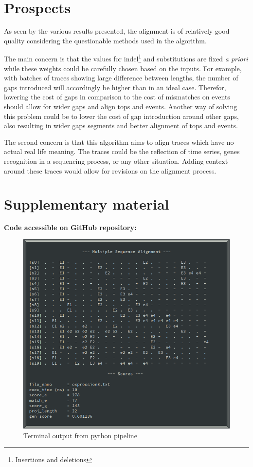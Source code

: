 \documentclass[12pt,a4paper]{article}
\begin{document}
\section{Prospects}

As seen by the various results presented, the alignment is of relatively good quality considering the questionable methods used in the algorithm.

The main concern is that the values for indel\footnote{Insertions and deletions} and substitutions are fixed \emph{a priori} while these weights could be carefully chosen based on the inputs.
For example, with batches of traces showing large difference between lengths, the number of gaps introduced will accordingly be higher than in an ideal case.
Therefor, lowering the cost of gaps in comparison to the cost of mismatches on events should allow for wider gaps and align tops and events.
Another way of solving this problem could be to lower the cost of gap introduction around other gaps, also resulting in wider gaps segments and better alignment of tops and events.

The second concern is that this algorithm aims to align traces which have no actual real life meaning.
The traces could be the reflection of time series, genes recognition in a sequencing process, or any other situation.
Adding context around these traces would allow for revisions on the alignment process.

\pagebreak




\section*{Supplementary material}

\noindent\footnotesize{\textbf{Code accessible on GitHub repository:}
\href{https://github.com/Damien-Garcia-Bioinformatics/aap\_mma\_project}{\color{blue}{https://github.com/Damien-Garcia-Bioinformatics/aap\_mma\_project}}}

\begin{figure}[H]
	\centering
	\includegraphics[width=0.75\linewidth]{img/terminal_output.png}
	\caption{Terminal output from python pipeline}
	\label{fig:output}
\end{figure}
\end{document}
